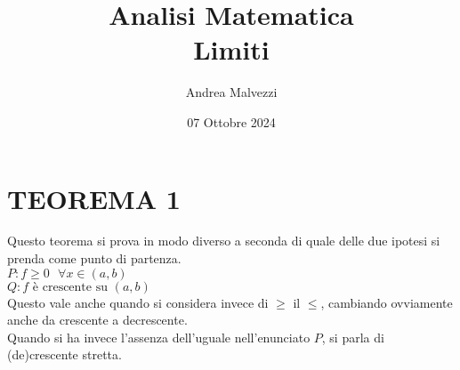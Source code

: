 \documentclass[12pt]{article}
\title{\textbf{Analisi Matematica\\Limiti}}
\date{07 Ottobre 2024}
\author{Andrea Malvezzi}
\begin{document}
\maketitle
\pagebreak
\tableofcontents
\pagebreak
\section{TEOREMA 1}
Questo teorema si prova in modo diverso a seconda di quale delle due ipotesi si prenda come punto di partenza.\\
$P: f \geq 0 \text{ } \forall x \in (a, b)$ \\
$Q: f \text{ è crescente su } (a, b)$ \\
Questo vale anche quando si considera invece di $\geq$ il $\leq$, cambiando ovviamente anche da crescente a decrescente.\\
Quando si ha invece l'assenza dell'uguale nell'enunciato $P$, si parla di (de)crescente stretta.
\end{document}
